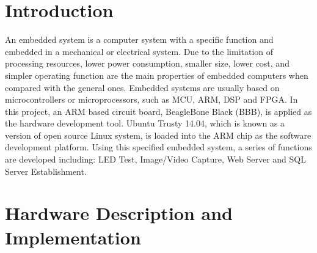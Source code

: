 \documentclass[12pt,journal,draftclsnofoot,onecolumn]{IEEEtran}
\begin{document}
\section{Introduction}\label{Intro}
An embedded system is a computer system with a specific function and embedded in a mechanical or electrical system. Due to the limitation of processing resources, lower power consumption, smaller size, lower cost, and simpler operating function are the main properties of embedded computers when compared with the general ones. Embedded systems are usually based on microcontrollers or microprocessors, such as MCU, ARM, DSP and FPGA. In this project, an ARM based circuit board, BeagleBone Black (BBB), is applied as the hardware development tool. Ubuntu Trusty 14.04, which is known as a version of open source Linux system, is loaded into the ARM chip as the software development platform. Using this specified embedded system, a series of functions are developed including: LED Test, Image/Video Capture, Web Server and SQL Server Establishment.


\section{Hardware Description and Implementation}\label{HdDes}
\end{document}
